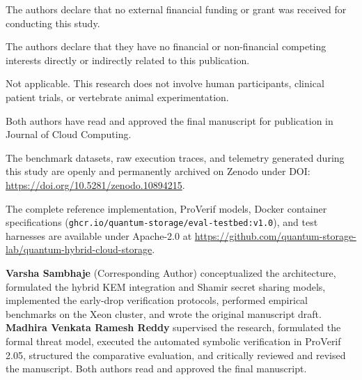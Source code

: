 \documentclass[pdflatex,sn-mathphys,Numbered]{sn-jnl}%
\theoremstyle{thmstyleone}%
\theoremstyle{thmstyletwo}%
\theoremstyle{thmstylethree}%
\begin{document}
The authors declare that no external financial funding or grant was received for conducting this study.

The authors declare that they have no financial or non-financial competing interests directly or indirectly related to this publication.

Not applicable. This research does not involve human participants, clinical patient trials, or vertebrate animal experimentation.

Both authors have read and approved the final manuscript for publication in Journal of Cloud Computing.

The benchmark datasets, raw execution traces, and telemetry generated during this study are openly and permanently archived on Zenodo under DOI: \url{https://doi.org/10.5281/zenodo.10894215}.

The complete reference implementation, ProVerif models, Docker container specifications (\texttt{ghcr.io/quantum-storage/eval-testbed:v1.0}), and test harnesses are available under Apache-2.0 at \url{https://github.com/quantum-storage-lab/quantum-hybrid-cloud-storage}.

\textbf{Varsha Sambhaje} (Corresponding Author) conceptualized the architecture, formulated the hybrid KEM integration and Shamir secret sharing models, implemented the early-drop verification protocols, performed empirical benchmarks on the Xeon cluster, and wrote the original manuscript draft. \textbf{Madhira Venkata Ramesh Reddy} supervised the research, formulated the formal threat model, executed the automated symbolic verification in ProVerif 2.05, structured the comparative evaluation, and critically reviewed and revised the manuscript. Both authors read and approved the final manuscript.
\end{document}
